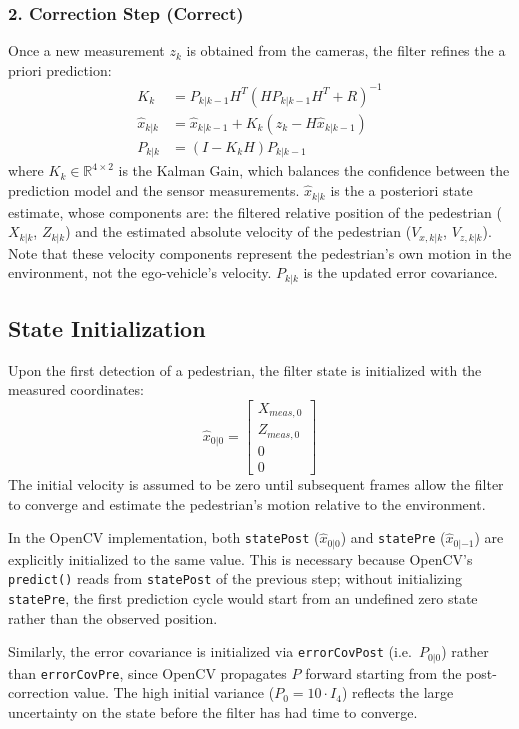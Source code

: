 \subsubsection{2. Correction Step (Correct)}
Once a new measurement $z_k$ is obtained from the cameras, the filter refines the a priori prediction:
\begin{align}
    K_k &= P_{k|k-1} H^T (H P_{k|k-1} H^T + R)^{-1} \\
    \hat{x}_{k|k} &= \hat{x}_{k|k-1} + K_k (z_k - H \hat{x}_{k|k-1}) \\
    P_{k|k} &= (I - K_k H) P_{k|k-1}
\end{align}
where $K_k \in \mathbb{R}^{4 \times 2}$ is the Kalman Gain, which balances the confidence between the prediction model and the sensor measurements. $\hat{x}_{k|k}$ is the a posteriori state estimate, whose components are: the filtered relative position of the pedestrian ($X_{k|k}$, $Z_{k|k}$) and the estimated absolute velocity of the pedestrian ($V_{x,k|k}$, $V_{z,k|k}$). Note that these velocity components represent the pedestrian's own motion in the environment, not the ego-vehicle's velocity. $P_{k|k}$ is the updated error covariance.

\subsection{State Initialization}

Upon the first detection of a pedestrian, the filter state is initialized with the measured coordinates:
\begin{equation}
    \hat{x}_{0|0} = \begin{bmatrix} X_{meas, 0} \\ Z_{meas, 0} \\ 0 \\ 0 \end{bmatrix}
\end{equation}
The initial velocity is assumed to be zero until subsequent frames allow the filter to converge and estimate the pedestrian's motion relative to the environment.

In the OpenCV implementation, both \texttt{statePost} ($\hat{x}_{0|0}$) and \texttt{statePre} ($\hat{x}_{0|-1}$) are explicitly initialized to the same value. This is necessary because OpenCV's \texttt{predict()} reads from \texttt{statePost} of the previous step; without initializing \texttt{statePre}, the first prediction cycle would start from an undefined zero state rather than the observed position.

Similarly, the error covariance is initialized via \texttt{errorCovPost} (i.e.\ $P_{0|0}$) rather than \texttt{errorCovPre}, since OpenCV propagates $P$ forward starting from the post-correction value. The high initial variance ($P_0 = 10 \cdot I_4$) reflects the large uncertainty on the state before the filter has had time to converge.

